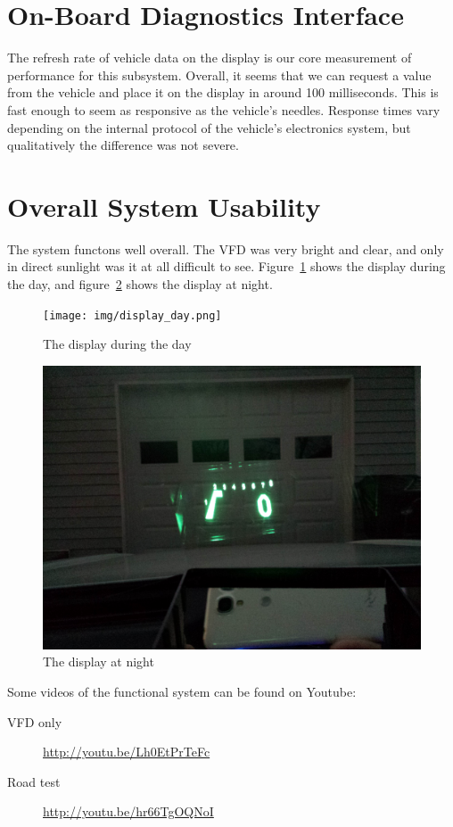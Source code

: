 \section{On-Board Diagnostics Interface}

The refresh rate of vehicle data on the display is our core measurement of
performance for this subsystem. Overall, it seems that we can request a value
from the vehicle and place it on the display in around 100 milliseconds. This
is fast enough to seem as responsive as the vehicle's needles. Response times
vary depending on the internal protocol of the vehicle's electronics system, but
qualitatively the difference was not severe.

\section{Overall System Usability}

The system functons well overall. The VFD was very bright and clear, and only
in direct sunlight was it at all difficult to see. Figure~\ref{fig:display-day}
shows the display during the day, and figure~\ref{fig:display-night} shows
the display at night.

\begin{figure}[h]
\texttt{[image: img/display\_day.png]}
\caption{The display during the day}
\label{fig:display-day}
\end{figure}

\begin{figure}[h]
\includegraphics[width=\textwidth]{img/display_night.jpg}
\caption{The display at night}
\label{fig:display-night}
\end{figure}

Some videos of the functional system can be found on Youtube:

\begin{description}
\item[VFD only]\url{http://youtu.be/Lh0EtPrTeFc}
\item[Road test] \url{http://youtu.be/hr66TgOQNoI}
\end{description}
